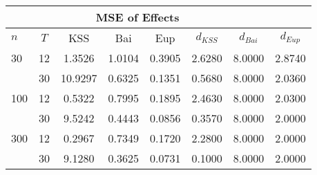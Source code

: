 \begin{tabular}{lccccccc} 
\hline \multicolumn{7}{c}{MSE of Effects} \\ \hline 
$n$ & $T$ & KSS & Bai & Eup & $d_{KSS}$ & $d_{Bai}$ & $d_{Eup}$ \\
\hline
30 & 12 &  1.3526  &  1.0104  &  0.3905  &  2.6280  &  8.0000  &  2.8740  \\
& 30 &  10.9297  &  0.6325  &  0.1351  &  0.5680  &  8.0000  &  2.0360  \\
100 & 12 &  0.5322  &  0.7995  &  0.1895  &  2.4630  &  8.0000  &  2.0300  \\
& 30 &  9.5242  &  0.4443  &  0.0856  &  0.3570  &  8.0000  &  2.0000  \\
300 & 12 &  0.2967  &  0.7349  &  0.1720  &  2.2800  &  8.0000  &  2.0000  \\
& 30 &  9.1280  &  0.3625  &  0.0731  &  0.1000  &  8.0000  &  2.0000  \\
\end{tabular} 
